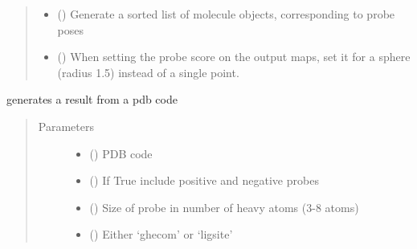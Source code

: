 \documentclass[letterpaper,10pt,english]{sphinxmanual}
\begin{document}
\begin{fulllineitems}
\begin{fulllineitems}
\begin{quote}
\begin{description}
\begin{itemize}
\item {} 
 () \textendash{} Generate a sorted list of molecule objects, corresponding to probe poses

\item {} 
 () \textendash{} When setting the probe score on the output maps, set it for a sphere (radius 1.5) instead of a single point.

\end{itemize}

\end{description}\end{quote}

\end{fulllineitems}


\begin{fulllineitems}
\label{\detokenize{calculation_api:hotspots.calculation.Runner.from_pdb}}
generates a result from a pdb code
\begin{quote}\begin{description}
\item[{Parameters}] \leavevmode\begin{itemize}
\item {} 
 () \textendash{} PDB code

\item {} 
 () \textendash{} If True include positive and negative probes

\item {} 
 () \textendash{} Size of probe in number of heavy atoms (3-8 atoms)

\item {} 
 () \textendash{} Either ‘ghecom’ or ‘ligsite’


\end{itemize}
\end{description}
\end{quote}
\end{fulllineitems}
\end{fulllineitems}
\end{document}
